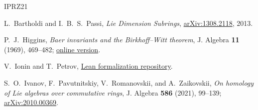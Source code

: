 \documentclass[a4paper,11pt,reqno]{amsart}
\begin{document}
\medskip
\begin{center}
\setlength{\fboxsep}{11pt}
\setlength{\fboxrule}{1pt}
\end{center}
\medskip

\begin{thebibliography}{IPRZ21}

L.~Bartholdi and I.~B.~S.~Passi,
\emph{Lie Dimension Subrings},
\href{https://arxiv.org/abs/1308.2118}{arXiv:1308.2118}, 2013.

P.~J.~Higgins,
\emph{Baer invariants and the Birkhoff--Witt theorem},
J. Algebra \textbf{11} (1969), 469--482;
\href{https://www.cip.ifi.lmu.de/\%7Egrinberg/algebra/higgins-baer.pdf}
{online version}.

V.~Ionin and T.~Petrov,
\href{https://github.com/TimmPeterson/lie-algebras}
{Lean formalization repository}.

S.~O.~Ivanov, F.~Pavutnitskiy, V.~Romanovskii, and A.~Zaikovskii,
\emph{On homology of Lie algebras over commutative rings},
J. Algebra \textbf{586} (2021), 99--139;
\href{https://arxiv.org/abs/2010.00369}{arXiv:2010.00369}.

\end{thebibliography}
\end{document}
